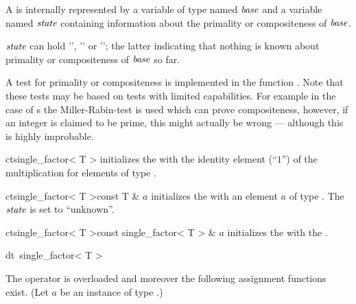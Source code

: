 
\DESCRIPTION

A  is internally represented by a variable of type  named
$\mathit{base}$ and a variable named $\mathit{state}$ containing information about the primality or compositeness
of $\mathit{base}$.

$\mathit{state}$ can hold '', '' or ''; the latter indicating
that nothing is known about primality or compositeness of $\mathit{base}$ so far.

A test for primality or compositeness is implemented in the function .
Note that these tests may be based on tests with limited capabilities.  For example in the case
of s the Miller-Rabin-test is used which can prove compositeness, however, if an
integer is claimed to be prime, this might actually be wrong --- although this is highly
improbable.



\CONS

\begin{fcode}{ct}{single_factor< T >}{}
  initializes the  with the identity element (``$1$'') of the
  multiplication for elements of type .
\end{fcode}

\begin{fcode}{ct}{single_factor< T >}{const T & $a$}
  initializes the  with an element $a$ of type .  The $\mathit{state}$
  is set to ``unknown''.
\end{fcode}

\begin{fcode}{ct}{single_factor< T >}{const single_factor< T > & $a$}
  initializes the  with the .
\end{fcode}

\begin{fcode}{dt}{~single_factor< T >}{}
\end{fcode}



\ASGN

The operator \code{=} is overloaded and moreover the following assignment functions exist.  (Let
$a$ be an instance of type .)


